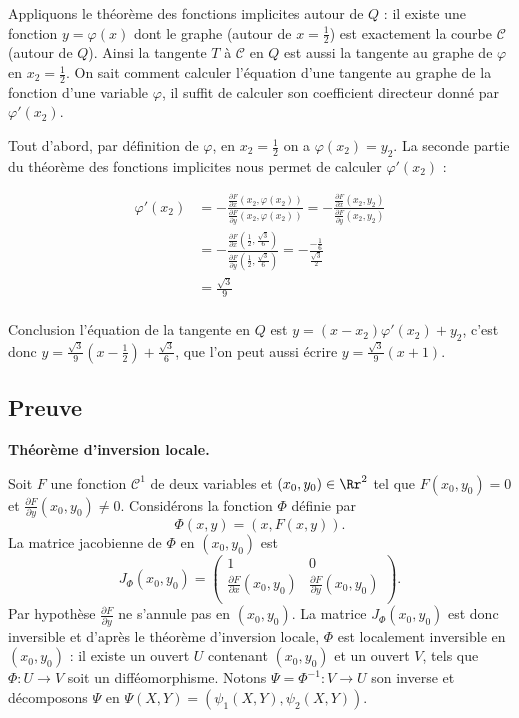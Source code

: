 \documentclass[11pt, class=report,crop=false]{standalone}
\begin{document}
   
Appliquons le théorème des fonctions implicites autour de $Q$ : il existe une fonction $y = \varphi(x)$ dont le graphe (autour de $x=\frac12$) est exactement la courbe $\mathcal{C}$ (autour de $Q$).
Ainsi la tangente $T$ à $\mathcal{C}$ en $Q$ est aussi la tangente au graphe de $\varphi$ en $x_2=\frac12$. 
On sait comment calculer l'équation d'une tangente au graphe de la fonction d'une variable $\varphi$, il suffit de calculer son coefficient directeur donné par
$\varphi'(x_2)$.

Tout d'abord, par définition de $\varphi$, en $x_2=\frac12$ on a $\varphi(x_2)=y_2$.
La seconde partie du théorème des fonctions implicites nous permet de calculer $\varphi'(x_2)$ :

\begin{align*}
\varphi'(x_2) 
  &=    -\frac{\frac{\partial F}{\partial x}(x_2, \varphi(x_2))}{\frac{\partial F}{\partial y}(x_2, \varphi(x_2))} 
  = -\frac{\frac{\partial F}{\partial x}(x_2, y_2)}{\frac{\partial F}{\partial y}(x_2, y_2)} \\
  &= -\frac{\frac{\partial F}{\partial x}( \frac12,\frac{\sqrt3}{6} )}{\frac{\partial F}{\partial y}( \frac12,\frac{\sqrt3}{6}) }   
  = - \frac{-\frac16}{\frac{\sqrt3}{2}} \\
  &= \frac{\sqrt3}{9} \\
\end{align*}

Conclusion l'équation de la tangente en $Q$ est $y=(x-x_2)\varphi'(x_2)+ y_2$, c'est donc
$y= \frac{\sqrt3}{9}(x-\frac12) + \frac{\sqrt3}{6}$,
que l'on peut aussi écrire $y=\frac{\sqrt3}{9}(x+1)$.

\subsection{Preuve}

\textbf{Théorème d'inversion locale.}

Soit $F$ une fonction $\mathcal{C}^1$ de deux variables et $(x_0,y_0) \in \Rr^2$ tel que $F(x_0,y_0)=0$ et $\frac{\partial F}{\partial y}(x_0,y_0)\neq 0$. Considérons la fonction $\Phi$ définie par
$$
\Phi(x,y)=(x,F(x,y)).
$$
La matrice jacobienne de $\Phi$ en $(x_0,y_0)$ est
$$
J_\Phi(x_0,y_0) = 
\begin{pmatrix}  1 & 0 \\
\frac{\partial F}{\partial x}(x_0,y_0) & \frac{\partial F}{\partial y}(x_0,y_0) \\ \end{pmatrix}.
$$
Par hypothèse $\frac{\partial F}{\partial y}$ ne s'annule pas en $(x_0,y_0)$. La matrice $J_\Phi(x_0,y_0)$ est donc inversible et d'après le théorème d'inversion locale, $\Phi$ est localement inversible en $(x_0,y_0)$ : il existe un ouvert $U$ contenant $(x_0,y_0)$ et un ouvert $V$, tels que $\Phi : U \to V$ soit un difféomorphisme. Notons $\Psi=\Phi^{-1} : V \to U$ son inverse et décomposons $\Psi$ en $\Psi(X,Y) = (\psi_1(X,Y),\psi_2(X,Y))$.
\end{document}
